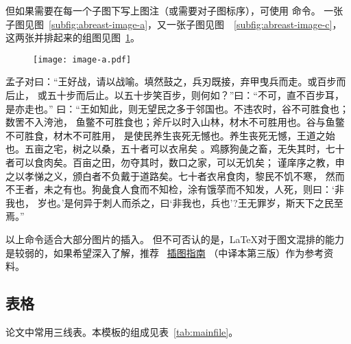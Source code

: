 但如果需要在每一个子图下写上图注（或需要对子图标序），可使用  命令。
一张子图见图~\ref{subfig:abreast-image-a}，又一张子图见图~~\ref{subfig:abreast-image-c}，这两张并排起来的组图见图~\ref{fig:abreast-image-a-c}。

\begin{figure}[htbp]
	\centering
	{\texttt{[image: image-a.pdf]}}
	\hspace{1cm}
	\label{fig:abreast-image-a-c}
\end{figure}

孟子对曰：“王好战，请以战喻。填然鼓之，兵刃既接，弃甲曳兵而走。或百步而后止，
或五十步而后止。以五十步笑百步，则何如？”曰：“不可，直不百步耳，是亦走也。”
曰：“王如知此，则无望民之多于邻国也。不违农时，谷不可胜食也；数罟不入洿池，
鱼鳖不可胜食也；斧斤以时入山林，材木不可胜用也。谷与鱼鳖不可胜食，材木不可胜用，
是使民养生丧死无憾也。养生丧死无憾，王道之始也。五亩之宅，树之以桑，五十者可以衣帛矣
。鸡豚狗彘之畜，无失其时，七十者可以食肉矣。百亩之田，勿夺其时，数口之家，可以无饥矣；
谨庠序之教，申之以孝悌之义，颁白者不负戴于道路矣。七十者衣帛食肉，黎民不饥不寒，
然而不王者，未之有也。狗彘食人食而不知检，涂有饿莩而不知发，人死，则曰：‘非我也，
岁也。’是何异于刺人而杀之，曰‘非我也，兵也’?王无罪岁，斯天下之民至焉。”

以上命令适合大部分图片的插入。
但不可否认的是，\LaTeX{}对于图文混排的能力是较弱的，如果希望深入了解，推荐~
\href{https://github.com/WenboSheng/epslatex-cn}{\LaTeXe 插图指南}
（中译本第三版）作为参考资料。

\subsection{表格}\label{subsec:tab}
论文中常用三线表。本模板的组成见表~\ref{tab:mainfile}。

